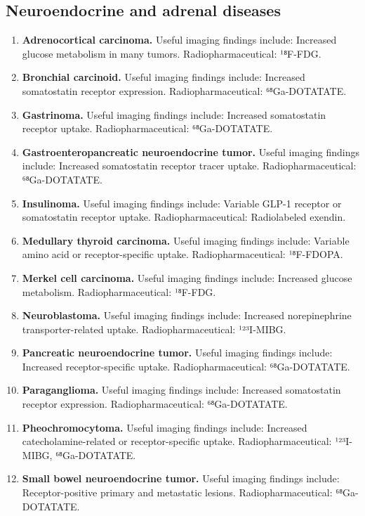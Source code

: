 \subsection{Neuroendocrine and adrenal diseases}
\begin{enumerate}[leftmargin=*,itemsep=0.45em,topsep=0.4em]
\item \textbf{Adrenocortical carcinoma.} Useful imaging findings include: Increased glucose metabolism in many tumors. Radiopharmaceutical: ¹⁸F-FDG.
\item \textbf{Bronchial carcinoid.} Useful imaging findings include: Increased somatostatin receptor expression. Radiopharmaceutical: ⁶⁸Ga-DOTATATE.
\item \textbf{Gastrinoma.} Useful imaging findings include: Increased somatostatin receptor uptake. Radiopharmaceutical: ⁶⁸Ga-DOTATATE.
\item \textbf{Gastroenteropancreatic neuroendocrine tumor.} Useful imaging findings include: Increased somatostatin receptor tracer uptake. Radiopharmaceutical: ⁶⁸Ga-DOTATATE.
\item \textbf{Insulinoma.} Useful imaging findings include: Variable GLP-1 receptor or somatostatin receptor uptake. Radiopharmaceutical: Radiolabeled exendin.
\item \textbf{Medullary thyroid carcinoma.} Useful imaging findings include: Variable amino acid or receptor-specific uptake. Radiopharmaceutical: ¹⁸F-FDOPA.
\item \textbf{Merkel cell carcinoma.} Useful imaging findings include: Increased glucose metabolism. Radiopharmaceutical: ¹⁸F-FDG.
\item \textbf{Neuroblastoma.} Useful imaging findings include: Increased norepinephrine transporter-related uptake. Radiopharmaceutical: ¹²³I-MIBG.
\item \textbf{Pancreatic neuroendocrine tumor.} Useful imaging findings include: Increased receptor-specific uptake. Radiopharmaceutical: ⁶⁸Ga-DOTATATE.
\item \textbf{Paraganglioma.} Useful imaging findings include: Increased somatostatin receptor expression. Radiopharmaceutical: ⁶⁸Ga-DOTATATE.
\item \textbf{Pheochromocytoma.} Useful imaging findings include: Increased catecholamine-related or receptor-specific uptake. Radiopharmaceutical: ¹²³I-MIBG, ⁶⁸Ga-DOTATATE.
\item \textbf{Small bowel neuroendocrine tumor.} Useful imaging findings include: Receptor-positive primary and metastatic lesions. Radiopharmaceutical: ⁶⁸Ga-DOTATATE.
\end{enumerate}

